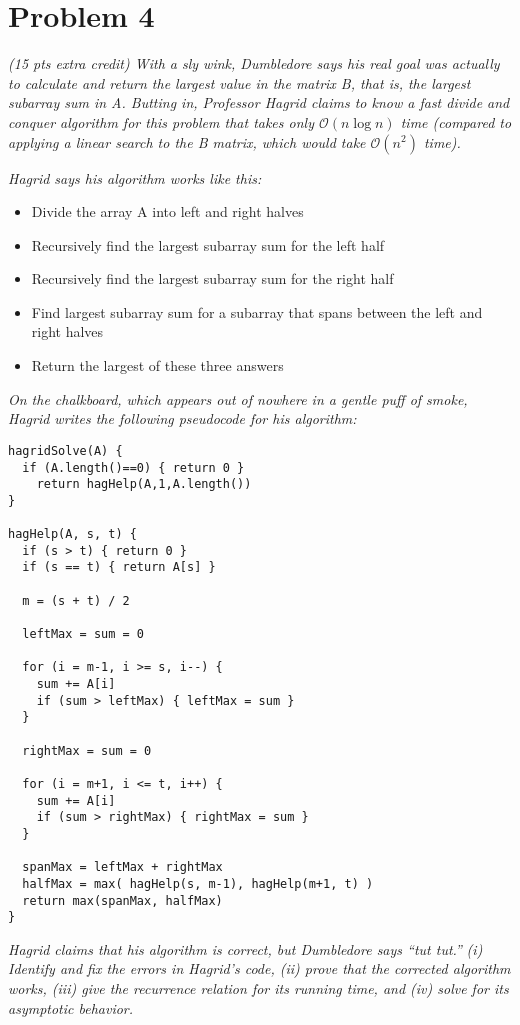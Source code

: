 \documentclass[12pt]{article} \setlength{\oddsidemargin}{0in}
\begin{document}
{\begin{enumerate}
\end{enumerate}

\newpage
\section*{Problem 4}

\textit{(15 pts extra credit) With a sly wink, Dumbledore says his
  real goal was actually to calculate and return the largest value in
  the matrix B, that is, the largest subarray sum in A. Butting in,
  Professor Hagrid claims to know a fast divide and conquer algorithm
  for this problem that takes only $\mathcal{O}(n \log n)$ time
  (compared to applying a linear search to the B matrix, which would
  take $\mathcal{O}(n^2)$ time).}

\textit{Hagrid says his algorithm works like this:}

\begin{itemize}
\item Divide the array A into left and right halves
\item Recursively find the largest subarray sum for the left half
\item Recursively find the largest subarray sum for the right half
\item Find largest subarray sum for a subarray that spans between the
  left and right halves
\item Return the largest of these three answers
\end{itemize}

\textit{On the chalkboard, which appears out of nowhere in a gentle puff of
smoke, Hagrid writes the following pseudocode for his algorithm:}

\begin{verbatim}
hagridSolve(A) {
  if (A.length()==0) { return 0 }
    return hagHelp(A,1,A.length())
}

hagHelp(A, s, t) {
  if (s > t) { return 0 }
  if (s == t) { return A[s] }

  m = (s + t) / 2

  leftMax = sum = 0

  for (i = m-1, i >= s, i--) {
    sum += A[i]
    if (sum > leftMax) { leftMax = sum }
  }

  rightMax = sum = 0

  for (i = m+1, i <= t, i++) {
    sum += A[i]
    if (sum > rightMax) { rightMax = sum }
  }

  spanMax = leftMax + rightMax
  halfMax = max( hagHelp(s, m-1), hagHelp(m+1, t) )
  return max(spanMax, halfMax)
}
\end{verbatim}
\textit{Hagrid claims that his algorithm is correct, but Dumbledore
  says ``tut tut.''}  \textit{(i) Identify and fix the errors in
  Hagrid's code, (ii) prove that the corrected algorithm works, (iii)
  give the recurrence relation for its running time, and (iv) solve
  for its asymptotic behavior.}

}
\end{document}
